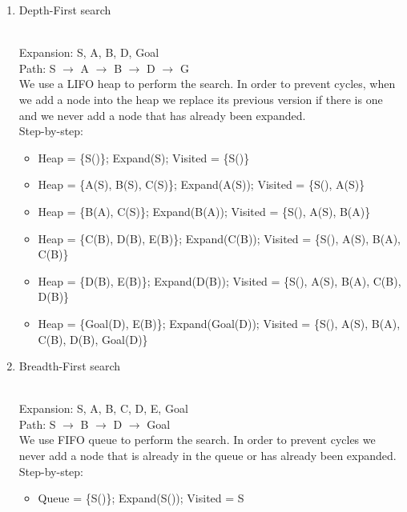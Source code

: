 \documentclass[9pt,a4paper]{extarticle}
\newenvironment{solution}
    {%
    \color{red}
    }
    { 
    \color{black}
    }
\begin{document}
    \begin{enumerate}
        \item Depth-First search
        \begin{solution}
        \\
        Expansion: S, A, B, D, Goal \\
        Path: S $\rightarrow$ A $\rightarrow$ B $\rightarrow$ D $\rightarrow$ G \\
        We use a LIFO heap to perform the search. In order to prevent cycles, when we add a node into the heap we replace its previous version if there is one and we never add a node that has already been expanded.\\
        Step-by-step:
        \begin{itemize}
            \item Heap = \{S()\}; Expand(S); Visited = \{S()\}
            \item Heap = \{A(S), B(S), C(S)\}; Expand(A(S)); Visited = \{S(), A(S)\}
            \item Heap = \{B(A), C(S)\}; Expand(B(A)); Visited = \{S(), A(S), B(A)\}
            \item Heap = \{C(B), D(B), E(B)\}; Expand(C(B));  Visited = \{S(), A(S), B(A), C(B)\}
            \item Heap = \{D(B), E(B)\}; Expand(D(B)); Visited = \{S(), A(S), B(A), C(B), D(B)\}
            \item Heap = \{Goal(D), E(B)\}; Expand(Goal(D)); Visited = \{S(), A(S), B(A), C(B), D(B), Goal(D)\}
        \end{itemize}
        \end{solution}
        \item Breadth-First search
        \begin{solution}
        \\
        Expansion: S, A, B, C, D, E, Goal \\
        Path: S $\rightarrow$ B $\rightarrow$ D $\rightarrow$ Goal \\
        We use FIFO queue to perform the search. In order to prevent cycles we never add a node that is already in the queue or has already been expanded.\\
        Step-by-step:
        \begin{itemize}
            \item Queue = \{S()\}; Expand(S()); Visited = S

\end{itemize}
\end{solution}
\end{enumerate}
\end{document}
